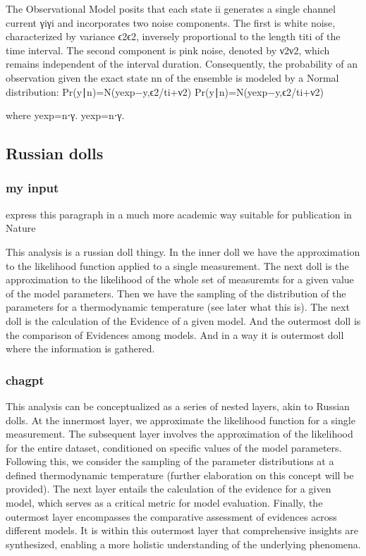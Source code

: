 \documentclass[pdflatex,sn-mathphys-num]{sn-jnl}%
\theoremstyle{thmstyleone}%
\theoremstyle{thmstyletwo}%
\theoremstyle{thmstylethree}%
\begin{document}
The Observational Model posits that each state ii generates a single channel current γiγi​ and incorporates two noise components. The first is white noise, characterized by variance ϵ2ϵ2, inversely proportional to the length titi​ of the time interval. The second component is pink noise, denoted by ν2ν2, which remains independent of the interval duration. Consequently, the probability of an observation given the exact state nn of the ensemble is modeled by a Normal distribution:
Pr(y∣n)=N(yexp−y,ϵ2/ti+ν2)
Pr(y∣n)=N(yexp​−y,ϵ2/ti​+ν2)

where
yexp=n⋅γ.
yexp​=n⋅γ.

\subsection{Russian dolls}




\subsubsection{my input}
express this paragraph in a much more academic way suitable for publication in Nature

This analysis is a russian doll thingy. In the inner doll we have the approximation to the likelihood function applied to a single measurement. The next doll is the approximation to the likelihood of the whole set of measuremts for a given value of the model parameters. Then we have the sampling of the distribution of the parameters for a thermodynamic temperature (see later what this is). The next doll is the calculation of the Evidence of a given model. And the outermost doll is the comparison of Evidences among models. And in a way it is outermost doll where the information is gathered. 

\subsubsection{chagpt}
This analysis can be conceptualized as a series of nested layers, akin to Russian dolls. At the innermost layer, we approximate the likelihood function for a single measurement. The subsequent layer involves the approximation of the likelihood for the entire dataset, conditioned on specific values of the model parameters. Following this, we consider the sampling of the parameter distributions at a defined thermodynamic temperature (further elaboration on this concept will be provided). The next layer entails the calculation of the evidence for a given model, which serves as a critical metric for model evaluation. Finally, the outermost layer encompasses the comparative assessment of evidences across different models. It is within this outermost layer that comprehensive insights are synthesized, enabling a more holistic understanding of the underlying phenomena.
\end{document}
